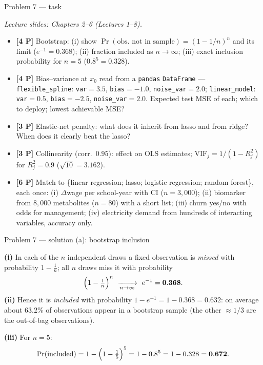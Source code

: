 \documentclass[aspectratio=169,11pt]{beamer}
\begin{document}
\begin{frame}{Problem 7 --- task}
  \begin{exercise}
    {\scriptsize\itshape Lecture slides: Chapters 2--6 (Lectures 1--8).}\par\smallskip
    \scriptsize
    \begin{itemize}
      \item[(a)] \textbf{[4 P]} Bootstrap: (i) show $\Pr(\text{obs.\ not in sample})=(1-1/n)^n$
        and its limit ($e^{-1}=0.368$); (ii) fraction included as $n\to\infty$;
        (iii) exact inclusion probability for $n=5$ ($0.8^5=0.328$).
      \item[(b)] \textbf{[4 P]} Bias--variance at $x_0$ read from a \texttt{pandas} \texttt{DataFrame}
        --- \texttt{flexible\_spline}: \texttt{var}$=3.5$, \texttt{bias}$=-1.0$, \texttt{noise\_var}$=2.0$;
        \texttt{linear\_model}: \texttt{var}$=0.5$, \texttt{bias}$=-2.5$, \texttt{noise\_var}$=2.0$.
        Expected test MSE of each; which to deploy; lowest achievable MSE?
      \item[(c)] \textbf{[3 P]} Elastic-net penalty: what does it inherit from lasso and from
        ridge? When does it clearly beat the lasso?
      \item[(d)] \textbf{[3 P]} Collinearity (corr.\ $0.95$): effect on OLS estimates;
        $\mathrm{VIF}_j=1/(1-R_j^2)$ for $R_j^2=0.9$ ($\sqrt{10}=3.162$).
      \item[(e)] \textbf{[6 P]} Match to \{linear regression; lasso; logistic regression;
        random forest\}, each once: (i) $\Delta$wage per school-year with CI ($n=3{,}000$);
        (ii) biomarker from $8{,}000$ metabolites ($n=80$) with a short list;
        (iii) churn yes/no with odds for management;
        (iv) electricity demand from hundreds of interacting variables, accuracy only.
    \end{itemize}
  \end{exercise}
\end{frame}

\begin{frame}{Problem 7 --- solution (a): bootstrap inclusion}
  \begin{solutionbox}
    \textbf{(i)} In each of the $n$ independent draws a fixed observation is \emph{missed} with
    probability $1-\tfrac1n$; all $n$ draws miss it with probability
    \[
      \Bigl(1-\tfrac1n\Bigr)^n\ \xrightarrow[n\to\infty]{}\ e^{-1}=\mathbf{0.368}.
    \]
    \textbf{(ii)} Hence it is \emph{included} with probability $1-e^{-1}=1-0.368=0.632$: on
    average about $\mathbf{63.2\%}$ of observations appear in a bootstrap sample (the other
    $\approx1/3$ are the out-of-bag observations).
    \medskip

    \textbf{(iii)} For $n=5$:
    \[
      \Pr(\text{included})=1-\Bigl(1-\tfrac15\Bigr)^5=1-0.8^5=1-0.328=\mathbf{0.672}.
    \]
  \end{solutionbox}
\end{frame}
\end{document}
